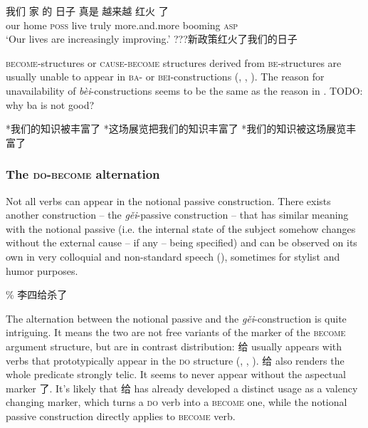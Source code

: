 \documentclass[UTF8, a4paper, oneside, scheme=plain]{ctexrep}
\newcommand{\corpus}[1]{\emph{#1}}
\newcommand{\translate}[1]{`#1'}
\newcommand*{\category}[1]{\textsc{#1}}
\begin{document}
\begin{exe}
    \ex\label{ex:verb-phrase.be-become.2} 
    \gll 我们 家 的 日子 真是 越来越 红火 了 \\
    our home \category{poss} live truly more.and.more booming \category{asp} \\
    \glt \translate{Our lives are increasingly improving.}
    \ex\label{ex:verb-phrase.be-become.cause-2} ???新政策红火了我们的日子
\end{exe}

\category{become}-structures or \category{cause}-\category{become} structures 
derived from \category{be}-structures 
are usually unable to appear in \category{ba}- or \category{bei}-constructions
(,
,
).
The reason for unavailability of \corpus{bèi}-constructions
seems to be the same as the reason in .
TODO: why ba is not good?

\begin{exe}
    \ex\label{ex:verb-phrase.be.impossible-1} *我们的知识被丰富了
    \ex\label{ex:verb-phrase.be.impossible-2} *这场展览把我们的知识丰富了
    \ex\label{ex:verb-phrase.be.impossible-3} *我们的知识被这场展览丰富了
\end{exe}

\subsubsection{The \category{do}-\category{become} alternation}\label{sec:ver-phrase.gei}

Not all verbs can appear in the notional passive construction.
There exists another construction -- the \corpus{gěi}-passive construction -- 
that has similar meaning with the notional passive
(i.e. the internal state of the subject somehow changes 
without the external cause -- if any -- being specified) and
can be observed on its own 
in very colloquial and non-standard speech
(),
sometimes for stylist and humor purposes.

\begin{exe}
    \ex\label{ex:verb-phrase.gei.1} \% 李四给杀了
\end{exe}

The alternation between the notional passive and the \corpus{gěi}-construction 
is quite intriguing.
It means the two are not free variants of the marker of the \category{become} argument structure,
but are in contrast distribution:
给 usually appears with verbs that prototypically appear in the \category{do} structure
(,
,
).
给 also renders the whole predicate strongly telic.
It seems to never appear without the aspectual marker 了.
It's likely that 给 has already developed a distinct usage 
as a valency changing marker, 
which turns a \category{do} verb into a \category{become} one,
while the notional passive construction directly applies to \category{become} verb.
\end{document}
